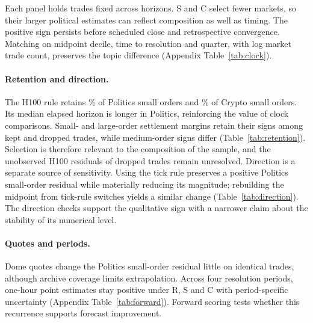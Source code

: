 \documentclass[sigconf,anonymous,nonacm,balance=false]{acmart}
\newcommand{\tabstyle}{\setlength{\tabcolsep}{3pt}}
\begin{document}
Each panel holds trades fixed across horizons. S and C select fewer markets, so their larger political estimates can reflect composition as well as timing. The positive sign persists before scheduled close and retrospective convergence. Matching on midpoint decile, time to resolution and quarter, with log market trade count, preserves the topic difference (Appendix Table~\ref{tab:clock}).

\paragraph{Retention and direction.}
The H100 rule retains \RetPol\% of Politics small orders and \RetCry\% of Crypto small orders. Its median elapsed horizon is longer in Politics, reinforcing the value of clock comparisons. Small- and large-order settlement margins retain their signs among kept and dropped trades, while medium-order signs differ (Table~\ref{tab:retention}). Selection is therefore relevant to the composition of the sample, and the unobserved H100 residuals of dropped trades remain unresolved. Direction is a separate source of sensitivity. Using the tick rule preserves a positive Politics small-order residual while materially reducing its magnitude; rebuilding the midpoint from tick-rule switches yields a similar change (Table~\ref{tab:direction}). The direction checks support the qualitative sign with a narrower claim about the stability of its numerical level.

\begin{table}[tbp]
\centering
\caption{H100 retention, elapsed time and settlement margins for retained and dropped trades. Probability bp; event-cluster SEs.}
\label{tab:retention}
\tabstyle

\end{table}

\begin{table}[tbp]
\centering
\caption{Direction sensitivity on the same H100 trades and fixed midpoint. Tick rule carries the last nonzero price change; zero changes cover \DirZero\% of trades. Difference: tick minus on-chain. Probability bp.}
\label{tab:direction}
\tabstyle

\end{table}

\paragraph{Quotes and periods.}
Dome quotes change the Politics small-order residual little on identical trades, although archive coverage limits extrapolation. Across four resolution periods, one-hour point estimates stay positive under R, S and C with period-specific uncertainty (Appendix Table~\ref{tab:forward}). Forward scoring tests whether this recurrence supports forecast improvement.
\end{document}
